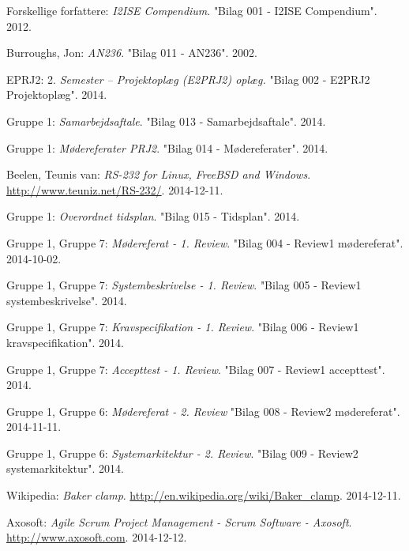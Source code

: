 \renewcommand{\bibname}{Litteraturliste}
\begin{thebibliography}{2}
 Forskellige forfattere:\textit{ I2ISE Compendium}. "Bilag 001 - I2ISE Compendium". 2012.

 Burroughs, Jon: \textit{AN236}. "Bilag 011 - AN236". 2002.

 EPRJ2: 2. \textit{Semester – Projektoplæg (E2PRJ2) 
 oplæg.} "Bilag 002 - E2PRJ2 Projektoplæg". 2014.
 
 Gruppe 1: \textit{Samarbejdsaftale}. "Bilag 013 - Samarbejdsaftale". 2014.

 Gruppe 1: \textit{Mødereferater PRJ2}. "Bilag 014 - Mødereferater". 2014.

 Beelen, Teunis van: \textit{RS-232 for Linux, FreeBSD and Windows}. \url{http://www.teuniz.net/RS-232/}. 2014-12-11.

 Gruppe 1: \textit{Overordnet tidsplan}. "Bilag 015 - Tidsplan". 2014.

 Gruppe 1, Gruppe 7: \textit{Mødereferat - 1. Review}. "Bilag 004 - Review1 mødereferat". 2014-10-02.

 Gruppe 1, Gruppe 7: \textit{Systembeskrivelse - 1. Review}. "Bilag 005 - Review1 systembeskrivelse". 2014.

 Gruppe 1, Gruppe 7: \textit{Kravspecifikation - 1. Review}. "Bilag 006 - Review1 kravspecifikation". 2014.

 Gruppe 1, Gruppe 7: \textit{Accepttest - 1. Review}. "Bilag 007 - Review1 accepttest". 2014.

 Gruppe 1, Gruppe 6: \textit{Mødereferat - 2. Review} "Bilag 008 - Review2 mødereferat". 2014-11-11.

 Gruppe 1, Gruppe 6: \textit{Systemarkitektur - 2. Review}. "Bilag 009 - Review2 systemarkitektur". 2014.

 Wikipedia: \textit{Baker clamp}. \url{http://en.wikipedia.org/wiki/Baker_clamp}. 2014-12-11.

 Axosoft: \textit{Agile Scrum Project Management - Scrum Software - Axosoft}. \url{http://www.axosoft.com}. 2014-12-12.


\end{thebibliography}
